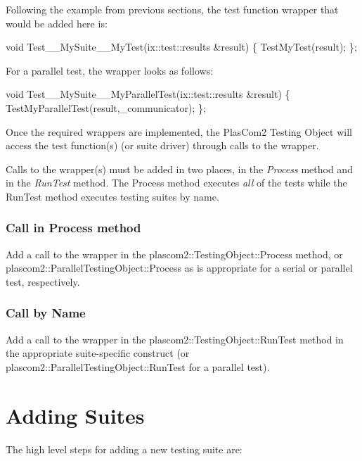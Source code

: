 Following the example from previous sections, the test function wrapper that would be added here is\+:


\begin{DoxyCode}
\textcolor{keywordtype}{void} Test\_\_MySuite\_\_MyTest(ix::test::results &result)
\{ TestMyTest(result); \};
\end{DoxyCode}


For a parallel test, the wrapper looks as follows\+:


\begin{DoxyCode}
\textcolor{keywordtype}{void} Test\_\_MySuite\_\_MyParallelTest(ix::test::results &result)
\{ TestMyParallelTest(result,\_communicator); \};
\end{DoxyCode}


Once the required wrappers are implemented, the Plas\+Com2 Testing Object will access the test function(s) (or suite driver) through calls to the wrapper.

Calls to the wrapper(s) must be added in two places, in the {\itshape Process} method and in the {\itshape Run\+Test} method. The Process method executes {\itshape all} of the tests while the Run\+Test method executes testing suites by name.\hypertarget{testing_reference_processcall}{}\subsubsection{Call in Process method}\label{testing_reference_processcall}
Add a call to the wrapper in the plascom2\+::\+Testing\+Object\+::\+Process method, or plascom2\+::\+Parallel\+Testing\+Object\+::\+Process as is appropriate for a serial or parallel test, respectively.\hypertarget{testing_reference_callbyname}{}\subsubsection{Call by Name}\label{testing_reference_callbyname}
Add a call to the wrapper in the plascom2\+::\+Testing\+Object\+::\+Run\+Test method in the appropriate suite-\/specific construct (or plascom2\+::\+Parallel\+Testing\+Object\+::\+Run\+Test for a parallel test).\hypertarget{testing_reference_addsuite}{}\section{Adding Suites}\label{testing_reference_addsuite}
The high level steps for adding a new testing suite are\+:


